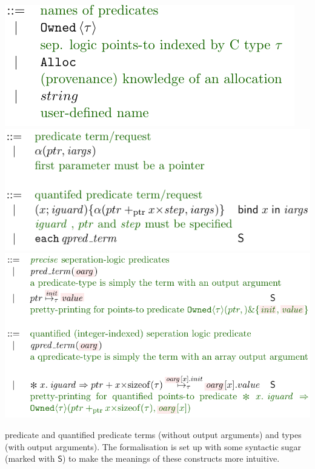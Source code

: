 \begin{marginfigure}
    \centering
    \includegraphics{figures/kernel-pred-name}
    \includegraphics{figures/kernel-qpred-term}
    \includegraphics{figures/kernel-qpred}
    \caption{ predicate and quantified predicate terms (without
        output arguments) and types (with output arguments). The formalisation
        is set up with some syntactic sugar (marked with $\mathsf{S}$) to make
        the meanings of these constructs more intuitive.}\label{fig:kernel-qpred}

\end{marginfigure}

